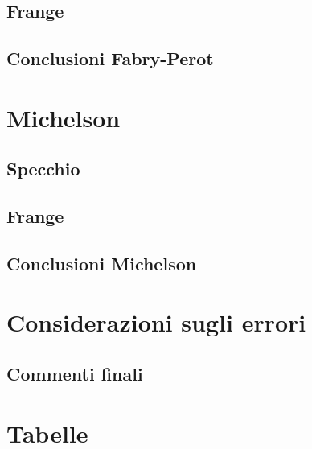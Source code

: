 \documentclass[letterpaper,12pt]{article}
\begin{document}
\subsection{Frange}



\subsection{Conclusioni Fabry-Perot}



\section{Michelson}

\subsection{Specchio}


\subsection{Frange}


\subsection{Conclusioni Michelson}




\section{Considerazioni sugli errori}
\label{sec:errori}

\subsection{Commenti finali}



\newpage
\section{Tabelle}
\end{document}
